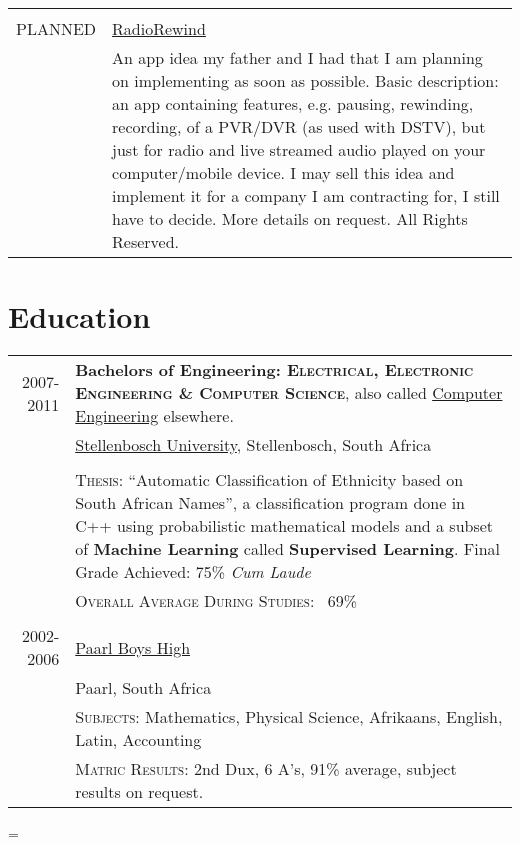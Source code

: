 \documentclass[a4paper,10pt,notitlepage]{article}
\newenvironment{absolutelynopagebreak}
  {\par\nobreak\vfil\penalty0\vfilneg
   \vtop\bgroup}
  {\par\xdef\tpd{\the\prevdepth}\egroup
   \prevdepth=\tpd}
\begin{document}
\begin{absolutelynopagebreak}
\begin{tabular}{r|p{11cm}}
		\multicolumn{2}{c}{} \\
		\textsc{PLANNED}            &                                                                                                                  
		\href{www.laurcode.com}{RadioRewind}\\&\footnotesize{An app idea my father and I had that I am planning on implementing as soon as possible. Basic description: an app containing features, e.g. pausing, rewinding, recording, of a PVR/DVR (as used with DSTV), but just for radio and live streamed audio played on your computer/mobile device. I may sell this idea and implement it for a company I am contracting for, I still have to decide. More details on request. All Rights Reserved.} \\
		
	\end{tabular}
	
	\section{Education}
	\begin{tabular}{r|p{11cm}}
		
		\textsc{2007-2011} & \textbf{Bachelors of Engineering: \textsc{Electrical, Electronic Engineering \& Computer Science}}, also called \href{https://en.wikipedia.org/wiki/Computer_engineering}{Computer Engineering} elsewhere. \\
		& \href{https://en.wikipedia.org/wiki/Stellenbosch_University}{Stellenbosch University}, Stellenbosch, South Africa \\
		
		\multicolumn{2}{c}{}\\
		
		& \textsc{Thesis}: ``Automatic Classification of Ethnicity based on South African Names'', a classification program done in C++ using probabilistic mathematical models and a subset of \textbf{Machine Learning} called \textbf{Supervised Learning}. \small Final Grade Achieved: 75\% \textit{Cum Laude} \\
		&\normalsize \textsc{Overall Average During Studies}: ~69\% \\
		
		\multicolumn{2}{c}{}\\
		
		\textsc{2002-2006} & \href{https://en.wikipedia.org/wiki/Paarl_Boys_27_High_School}{Paarl Boys High} \\ & \normalsize Paarl, South Africa \\
		&\textsc{Subjects}: Mathematics, Physical Science, Afrikaans, English, Latin, Accounting \\
		&\normalsize \textsc{Matric Results}: 2nd Dux, 6 A's, 91\% average, subject results on request. \\
		
	\end{tabular}
	
\end{absolutelynopagebreak}
\end{document}
